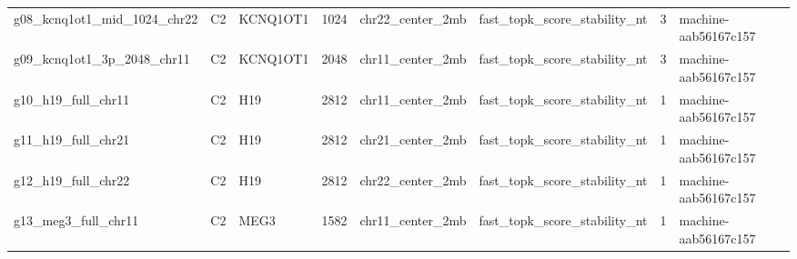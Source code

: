 \begin{tabular}{llllllll}
g08\_kcnq1ot1\_mid\_1024\_chr22 & C2 & KCNQ1OT1 & 1024 & chr22\_center\_2mb & fast\_topk\_score\_stability\_nt & 3 & machine-aab56167c157 \\
g09\_kcnq1ot1\_3p\_2048\_chr11 & C2 & KCNQ1OT1 & 2048 & chr11\_center\_2mb & fast\_topk\_score\_stability\_nt & 3 & machine-aab56167c157 \\
g10\_h19\_full\_chr11 & C2 & H19 & 2812 & chr11\_center\_2mb & fast\_topk\_score\_stability\_nt & 1 & machine-aab56167c157 \\
g11\_h19\_full\_chr21 & C2 & H19 & 2812 & chr21\_center\_2mb & fast\_topk\_score\_stability\_nt & 1 & machine-aab56167c157 \\
g12\_h19\_full\_chr22 & C2 & H19 & 2812 & chr22\_center\_2mb & fast\_topk\_score\_stability\_nt & 1 & machine-aab56167c157 \\
g13\_meg3\_full\_chr11 & C2 & MEG3 & 1582 & chr11\_center\_2mb & fast\_topk\_score\_stability\_nt & 1 & machine-aab56167c157 \\
\bottomrule
\end{tabular}

